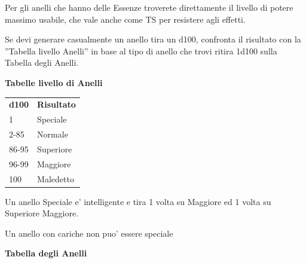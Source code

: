\documentclass[a4paper,11pt,twoside,openany]{book}
\begin{document}
{Per gli anelli che hanno delle Essenze troverete direttamente il livello di potere massimo usabile, che vale anche come TS per resistere agli effetti.

Se devi generare casualmente un anello tira un d100, confronta il risultato con la ''Tabella livello Anelli'' in base al tipo di anello che trovi ritira 1d100 sulla Tabella degli Anelli.

\bigskip

\textbf{Tabelle livello di Anelli}

\medskip
\begin{tabular}{ll}
\toprule
\textbf{d100} & \textbf{Risultato}\tabularnewline
1 & Speciale\tabularnewline
2-85 & Normale\tabularnewline
86-95 & Superiore\tabularnewline
96-99 & Maggiore\tabularnewline
100 & Maledetto\tabularnewline

\end{tabular}

\bigskip

Un anello Speciale e' intelligente e tira 1 volta su Maggiore ed 1 volta su Superiore Maggiore.

Un anello con cariche non puo' essere speciale

\pagebreak

\textbf{Tabella degli Anelli}

\medskip

}
\end{document}
